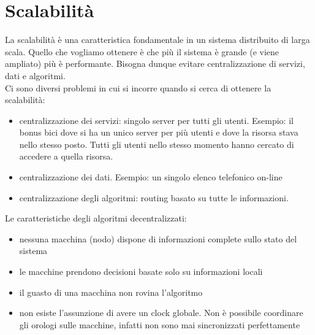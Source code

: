 \section{Scalabilità} 
La scalabilità è una caratteristica fondamentale in un sistema distribuito di larga scala. Quello che vogliamo ottenere è che più il sistema è grande (e viene ampliato) più è performante. Bisogna dunque evitare centralizzazione di servizi, dati e algoritmi.\\

Ci sono diversi problemi in cui si incorre quando si cerca di ottenere la scalabilità: 
\begin{itemize}
    \item centralizzazione dei servizi: singolo server per tutti gli utenti. Esempio: il bonus bici dove si ha un unico server per più utenti e dove la risorsa stava nello stesso posto. Tutti gli utenti nello stesso momento hanno cercato di accedere a quella risorsa.
    \item centralizzazione dei dati. Esempio: un singolo elenco telefonico on-line 
    \item centralizzazione degli algoritmi: routing basato su tutte le informazioni.
\end{itemize}

Le caratteristiche degli algoritmi decentralizzati: 
\begin{itemize}
    \item nessuna macchina (nodo) dispone di informazioni complete sullo stato del sistema
    \item le macchine prendono decisioni basate solo su informazioni locali
    \item il guasto di una macchina non rovina l'algoritmo
    \item non esiste l'assunzione di avere un clock globale. Non è possibile coordinare gli orologi sulle macchine, infatti non sono mai sincronizzati perfettamente
\end{itemize}

